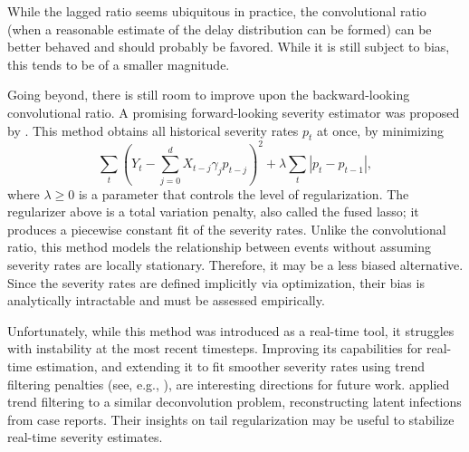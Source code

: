 \documentclass{article}
\begin{document}
While the lagged ratio seems ubiquitous in practice, the convolutional ratio
(when  a reasonable estimate of the delay distribution can be formed) can be
better behaved and should probably be favored. While it is still subject to
bias, this tends to be of a smaller magnitude. 

Going beyond, there is still room to improve upon the backward-looking
convolutional ratio. 
A promising forward-looking severity estimator was proposed by \citet{fusedlasso}. 
This method obtains all historical severity rates $p_t$ at once, by minimizing  
\[
\sum_t (Y_t - \sum_{j=0}^d X_{t-j}\gamma_j p_{t-j})^2 + 
\lambda \sum_t |p_t - p_{t-1}|,
\]
\noindent where $\lambda \geq 0$ is a parameter that controls the level of
regularization. The regularizer above is a total variation penalty, also called the fused lasso; it produces a piecewise constant fit of the severity rates.
Unlike the convolutional ratio, this method models the relationship between events without assuming severity rates are locally stationary. 
Therefore, it may be a less biased alternative.
Since the severity rates are defined implicitly via optimization, their bias is analytically intractable and must be assessed empirically.

Unfortunately, while this method was introduced as a real-time tool, it struggles with instability at the most recent timesteps.
Improving its capabilities for real-time estimation, 
and extending it to fit smoother severity rates using
trend filtering penalties (see, e.g., \citealp{Tibshirani2014}), are interesting
directions for future work. \citet{Jahja2022} applied trend filtering to a
similar deconvolution problem, reconstructing latent infections from case
reports. Their insights on tail regularization may be useful to stabilize
real-time severity estimates.

\end{document}
